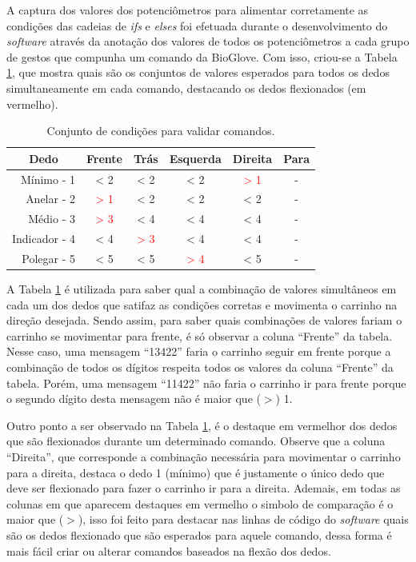 \documentclass[
	12pt,				%
	openright,			%
	oneside,			%
	a4paper,			%
	english,			%
	brazil				%
	]{abntex2}
\begin{document}
		A captura dos valores dos potenciômetros para alimentar corretamente as condições das cadeias de \textit{ifs} e \textit{elses} foi efetuada durante o desenvolvimento do \textit{software} através da anotação dos valores de todos os potenciômetros a cada grupo de gestos que compunha um comando da BioGlove. Com isso, criou-se a Tabela \ref{Tab:dedos-e-comandos1}, que mostra quais são os conjuntos de valores esperados para todos os dedos simultaneamente em cada comando, destacando os dedos flexionados (em vermelho). 
		
\begin{table}[H]
	\centering
  \caption{Conjunto de condições para validar comandos.}
  \begin{tabular}{r|ccccc}
		\midrule
\multicolumn{1}{c|}{Dedo} 					&       Frente			 & 				Trás				& 		Esquerda			 & 		Direita					& Para	\\
			 \midrule
			 Mínimo - 1    		& < 2   						 & < 2   							& < 2    						 &\textcolor{red}{> 1}&	-			\\
			 Anelar - 2    		&\textcolor{red}{> 1}& < 2   							& < 2  	 						 & < 2   							&	-			\\
			 Médio - 3    		&\textcolor{red}{> 3}& < 4   							& < 4   						 & < 4   							&	-			\\
			 Indicador - 4    & < 4   						 &\textcolor{red}{> 3}& < 4 							 & < 4   							&	-			\\
			 Polegar - 5    	& < 5   						 & < 5   							&\textcolor{red}{> 4}& < 5   							&	-			\\
		 \midrule
	\end{tabular}
  \label{Tab:dedos-e-comandos1}
  \end{table}

		A Tabela \ref{Tab:dedos-e-comandos1} é utilizada para saber qual a combinação de valores simultâneos em cada um dos dedos que satifaz as condições corretas e movimenta o carrinho na direção desejada. Sendo assim, para saber quais combinações de valores fariam o carrinho se movimentar para frente, é só observar a coluna ``Frente'' da tabela. Nesse caso, uma mensagem ``13422'' faria o carrinho seguir em frente porque a combinação de todos os dígitos respeita todos os valores da coluna ``Frente'' da tabela. Porém, uma mensagem ``11422'' não faria o carrinho ir para frente porque o segundo dígito desta mensagem não é maior que ($>$) 1.

		Outro ponto a ser observado na Tabela \ref{Tab:dedos-e-comandos1}, é o destaque em vermelhor dos dedos que são flexionados durante um determinado comando. Observe que a coluna ``Direita'', que corresponde a combinação necessária para movimentar o carrinho para a direita, destaca o dedo 1 (mínimo) que é justamente o único dedo que deve ser flexionado para fazer o carrinho ir para a direita. Ademais, em todas as colunas em que aparecem destaques em vermelho o simbolo de comparação é o maior que ($>$), isso foi feito para destacar nas linhas de código do \textit{software} quais são os dedos flexionado que são esperados para aquele comando, dessa forma é mais fácil criar ou alterar comandos baseados na flexão dos dedos.
\end{document}
